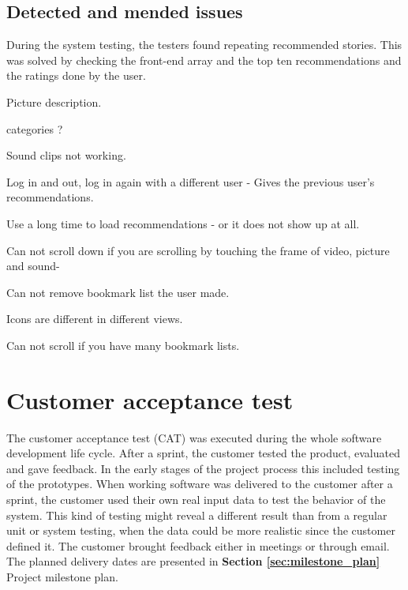 			
\subsection{Detected and mended issues}

During the system testing, the testers found repeating recommended stories. This was solved by checking the front-end array and the top ten recommendations and the ratings done by the user. \newline

Picture description. \newline

categories ? \newline

Sound clips not working.\newline

Log in and out, log in again with a different user - Gives the previous user's recommendations. \newline

Use a long time to load recommendations - or it does not show up at all.\newline

Can not scroll down if you are scrolling by touching the frame of video, picture and sound- \newline

Can not remove bookmark list the user made. \newline

Icons are different in different views.\newline

Can not scroll if you have many bookmark lists.\newline

\section{Customer acceptance test}
\label{sec:acceptance_test}

The customer acceptance test (CAT) was executed during the whole software development life cycle. After a sprint, the customer tested the product, evaluated and gave feedback. In the early stages of the project process this included testing of the prototypes. When working software was delivered to the customer after a sprint, the customer used their own real input data to test the behavior of the system. This kind of testing might reveal a different result than from a regular unit or system testing, when the data could be more realistic since the customer defined it. The customer brought feedback either in meetings or through email. The planned delivery dates are presented in \textbf{Section \ref{sec:milestone_plan}} Project milestone plan.  

